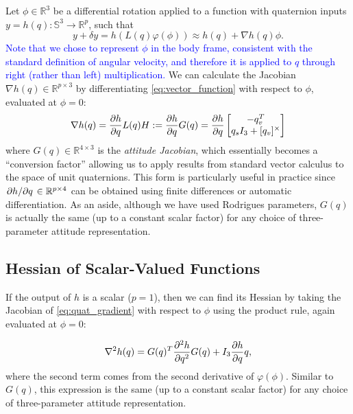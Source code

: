 \documentclass[letterpaper, 10 pt, conference]{ieeeconf}  %
\newcommand{\R}{\mathbb{R}}
\newcommand{\Q}{\mathbb{S}^3}
\newcommand{\skewmat}[1]{[#1]^\times}
\newcommand{\added}[1]{\textcolor{blue}{#1}}
\begin{document}
        Let $\phi \in \R^3$ be a differential rotation applied to a function with
        quaternion inputs 
        $y = h(q): \Q \to \R^p$, such that
        \begin{equation} \label{eq:vector_function}
            y + \delta y = h(L(q) \varphi(\phi)) \approx h(q) +  \nabla h(q) \phi.
        \end{equation}
        \added{Note that we chose to represent $\phi$ in the body frame, consistent with the standard definition of angular velocity, and therefore it is applied to $q$ through right (rather than left) multiplication.} We can calculate the Jacobian $\nabla h(q) \in \R^{p \times 3}$ by
        differentiating \eqref{eq:vector_function} with respect to $\phi$, evaluated at
        $\phi = 0$:
        \begin{equation} \label{eq:quat_gradient}
            \nabla h(q) = \pdv{h}{q} L(q) H := \pdv{h}{q} G(q) 
                        = \pdv{h}{q} \begin{bmatrix} 
                            -q_v^T \\ 
                            q_s I_3 + \skewmat{q_v}
                        \end{bmatrix}
        \end{equation}
        where $G(q) \in \R^{4 \times 3}$ is the \textit{attitude Jacobian}, which
        essentially becomes a ``conversion factor'' allowing us to apply results from
        standard vector calculus to the space of unit quaternions. This form is
        particularly useful in practice since $\pdv*{h}{q} \in \R^{p \times 4}$ can be
        obtained using finite differences or automatic differentiation.
        As an aside, although we have used Rodrigues parameters, $G(q)$ is actually the
        same (up to a constant scalar factor) for any choice of three-parameter attitude
        representation.

    \subsection{Hessian of Scalar-Valued Functions}
	    If the output of $h$ is a scalar ($p = 1$), then we can find its Hessian by
	    taking the Jacobian of \eqref{eq:quat_gradient} with respect to $\phi$ using the
        product rule, again evaluated at $\phi = 0$:

	    \begin{equation} \label{eq:quat_hessian}
            \nabla^2 h(q) = G(q)^T \pdv[2]{h}{q} G(q) + I_3 \pdv{h}{q}q,
	    \end{equation}
	    where the second term comes from the second derivative of $\varphi(\phi)$.
	    Similar to $G(q)$, this expression is the same (up to a constant scalar factor) for any
        choice of three-parameter attitude representation.
        
\end{document}
